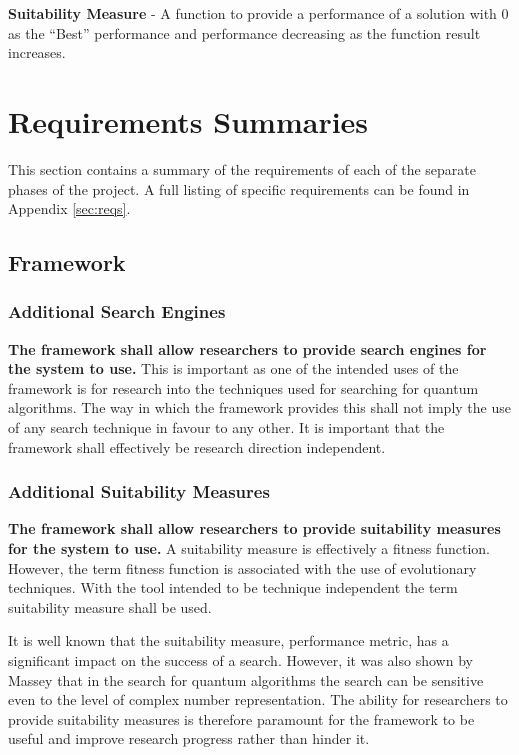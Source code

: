\documentclass[authoryearcitations]{UoYCSproject}
\begin{document}
\textbf{Suitability Measure} - A function to provide a performance of a solution with $0$ as the ``Best'' performance and performance decreasing as the function result increases.


\section{Requirements Summaries}
This section contains a summary of the requirements of each of the separate phases of the project.
A full listing of specific requirements can be found in Appendix \ref{sec:reqs}.

\subsection{Framework}
\subsubsection{Additional Search Engines}
\textbf{The framework shall allow researchers to provide search engines for the system to use.}
This is important as one of the intended uses of the framework is for research into the techniques used for searching for quantum algorithms.
The way in which the framework provides this shall not imply the use of any search technique in favour to any other.
It is important that the framework shall effectively be research direction independent.

\subsubsection{Additional Suitability Measures}
\textbf{The framework shall allow researchers to provide suitability measures for the system to use.}
A suitability measure is effectively a fitness function.
However, the term fitness function is associated with the use of evolutionary techniques.
With the tool intended to be technique independent the term suitability measure shall be used.

It is well known that the suitability measure, performance metric, has a significant impact on the success of a search.
However, it was also shown by Massey\cite{masseythesis} that in the search for quantum algorithms the search can be sensitive even to the level of complex number representation.
The ability for researchers to provide suitability measures is therefore paramount for the framework to be useful and improve research progress rather than hinder it.
\end{document}
